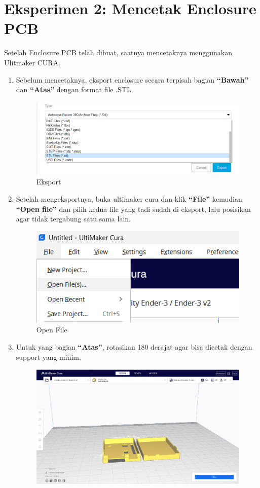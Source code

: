 \section{Eksperimen 2: Mencetak Enclosure PCB}
Setelah Enclosure PCB telah dibuat, saatnya mencetaknya menggunakan Ulitmaker CURA. 
\begin{enumerate}
    \item Sebelum mencetaknya, eksport enclosure secara terpisah bagian
     \textbf{“Bawah”} dan \textbf{“Atas”} dengan format file .STL.
     \begin{figure}[H]
        \centering
        \includegraphics[width=0.5\linewidth]{P3/img/Eksport.png}
        \caption{Eksport}
        \label{fig:Eksport}
    \end{figure}
    \item Setelah mengeksportnya, buka ultimaker cura dan klik \textbf{“File”} kemudian 
    \textbf{“Open file”} dan pilih kedua file yang tadi sudah di eksport, 
    lalu posisikan agar tidak tergabung satu sama lain.
     \begin{figure}[H]
        \centering
        \includegraphics[width=0.5\linewidth]{P3/img/Open File.png}
        \caption{Open File}
        \label{fig:Open File}
    \end{figure}
    \item Untuk yang bagian \textbf{“Atas”}, rotasikan 180 derajat agar bisa dicetak dengan support yang minim.
    \begin{figure}[H]
       \centering
       \includegraphics[width=0.5\linewidth]{P3/img/Enclosure 3D.png}

\end{figure}
\end{enumerate}
